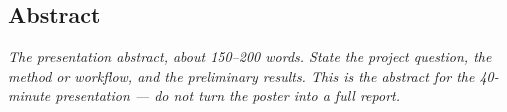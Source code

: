 \documentclass[final]{beamer}
\newcommand{\fillin}[1]{{\color{gray}\itshape #1}}
\begin{document}
\subsection{Abstract}

\fillin{The presentation abstract, about 150--200 words. State the project
question, the method or workflow, and the preliminary results. This is the
abstract for the 40-minute presentation --- do not turn the poster into a
full report.}
\end{document}
